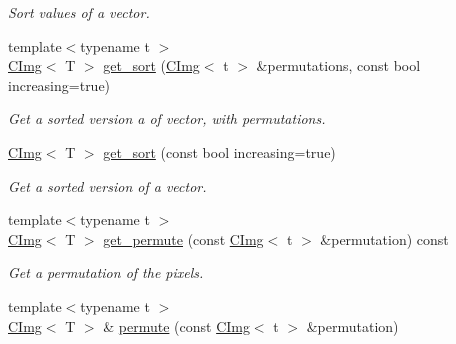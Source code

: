 \begin{DoxyCompactItemize}
\begin{DoxyCompactList}\small\item\em Sort values of a vector. \item\end{DoxyCompactList}\item 
\hypertarget{structcimg__library_1_1_c_img_aec750d5082ec7fb51f7b2e199ebbaab6}{
{\footnotesize template$<$typename t $>$ }\\\hyperlink{structcimg__library_1_1_c_img}{CImg}$<$ T $>$ \hyperlink{structcimg__library_1_1_c_img_aec750d5082ec7fb51f7b2e199ebbaab6}{get\_\-sort} (\hyperlink{structcimg__library_1_1_c_img}{CImg}$<$ t $>$ \&permutations, const bool increasing=true)}
\label{structcimg__library_1_1_c_img_aec750d5082ec7fb51f7b2e199ebbaab6}

\begin{DoxyCompactList}\small\item\em Get a sorted version a of vector, with permutations. \item\end{DoxyCompactList}\item 
\hypertarget{structcimg__library_1_1_c_img_ae453c92b2d658db213738ba45cf8dd10}{
\hyperlink{structcimg__library_1_1_c_img}{CImg}$<$ T $>$ \hyperlink{structcimg__library_1_1_c_img_ae453c92b2d658db213738ba45cf8dd10}{get\_\-sort} (const bool increasing=true)}
\label{structcimg__library_1_1_c_img_ae453c92b2d658db213738ba45cf8dd10}

\begin{DoxyCompactList}\small\item\em Get a sorted version of a vector. \item\end{DoxyCompactList}\item 
\hypertarget{structcimg__library_1_1_c_img_ae2e94f18080336a3bbadd818518702d5}{
{\footnotesize template$<$typename t $>$ }\\\hyperlink{structcimg__library_1_1_c_img}{CImg}$<$ T $>$ \hyperlink{structcimg__library_1_1_c_img_ae2e94f18080336a3bbadd818518702d5}{get\_\-permute} (const \hyperlink{structcimg__library_1_1_c_img}{CImg}$<$ t $>$ \&permutation) const }
\label{structcimg__library_1_1_c_img_ae2e94f18080336a3bbadd818518702d5}

\begin{DoxyCompactList}\small\item\em Get a permutation of the pixels. \item\end{DoxyCompactList}\item 
\hypertarget{structcimg__library_1_1_c_img_a3b396bd57feddfad174d15ebde429de7}{
{\footnotesize template$<$typename t $>$ }\\\hyperlink{structcimg__library_1_1_c_img}{CImg}$<$ T $>$ \& \hyperlink{structcimg__library_1_1_c_img_a3b396bd57feddfad174d15ebde429de7}{permute} (const \hyperlink{structcimg__library_1_1_c_img}{CImg}$<$ t $>$ \&permutation)}
\label{structcimg__library_1_1_c_img_a3b396bd57feddfad174d15ebde429de7}


\end{DoxyCompactItemize}
